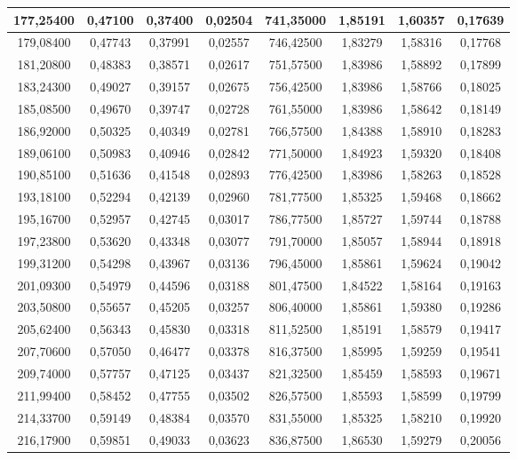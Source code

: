 \documentclass[a4paper,12pt]{article}
\numberwithin{equation}{section}
\begin{document}
\begin{appendices}
\begin{longtable}[c]{|c|c|c|c|c|c|c|c|}
177,25400	&	0,47100	&	0,37400	&	0,02504	&	741,35000	&	1,85191	&	1,60357	&	0,17639	\\\hline
179,08400	&	0,47743	&	0,37991	&	0,02557	&	746,42500	&	1,83279	&	1,58316	&	0,17768	\\\hline
181,20800	&	0,48383	&	0,38571	&	0,02617	&	751,57500	&	1,83986	&	1,58892	&	0,17899	\\\hline
183,24300	&	0,49027	&	0,39157	&	0,02675	&	756,42500	&	1,83986	&	1,58766	&	0,18025	\\\hline
185,08500	&	0,49670	&	0,39747	&	0,02728	&	761,55000	&	1,83986	&	1,58642	&	0,18149	\\\hline
186,92000	&	0,50325	&	0,40349	&	0,02781	&	766,57500	&	1,84388	&	1,58910	&	0,18283	\\\hline
189,06100	&	0,50983	&	0,40946	&	0,02842	&	771,50000	&	1,84923	&	1,59320	&	0,18408	\\\hline
190,85100	&	0,51636	&	0,41548	&	0,02893	&	776,42500	&	1,83986	&	1,58263	&	0,18528	\\\hline
193,18100	&	0,52294	&	0,42139	&	0,02960	&	781,77500	&	1,85325	&	1,59468	&	0,18662	\\\hline
195,16700	&	0,52957	&	0,42745	&	0,03017	&	786,77500	&	1,85727	&	1,59744	&	0,18788	\\\hline
197,23800	&	0,53620	&	0,43348	&	0,03077	&	791,70000	&	1,85057	&	1,58944	&	0,18918	\\\hline
199,31200	&	0,54298	&	0,43967	&	0,03136	&	796,45000	&	1,85861	&	1,59624	&	0,19042	\\\hline
201,09300	&	0,54979	&	0,44596	&	0,03188	&	801,47500	&	1,84522	&	1,58164	&	0,19163	\\\hline
203,50800	&	0,55657	&	0,45205	&	0,03257	&	806,40000	&	1,85861	&	1,59380	&	0,19286	\\\hline
205,62400	&	0,56343	&	0,45830	&	0,03318	&	811,52500	&	1,85191	&	1,58579	&	0,19417	\\\hline
207,70600	&	0,57050	&	0,46477	&	0,03378	&	816,37500	&	1,85995	&	1,59259	&	0,19541	\\\hline
209,74000	&	0,57757	&	0,47125	&	0,03437	&	821,32500	&	1,85459	&	1,58593	&	0,19671	\\\hline
211,99400	&	0,58452	&	0,47755	&	0,03502	&	826,57500	&	1,85593	&	1,58599	&	0,19799	\\\hline
214,33700	&	0,59149	&	0,48384	&	0,03570	&	831,55000	&	1,85325	&	1,58210	&	0,19920	\\\hline
216,17900	&	0,59851	&	0,49033	&	0,03623	&	836,87500	&	1,86530	&	1,59279	&	0,20056	\\\hline

\end{longtable}
\end{appendices}
\end{document}
